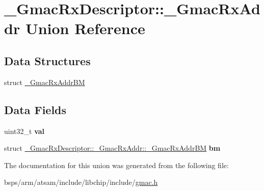 \hypertarget{union__GmacRxDescriptor_1_1__GmacRxAddr}{}\section{\+\_\+\+Gmac\+Rx\+Descriptor\+::\+\_\+\+Gmac\+Rx\+Addr Union Reference}
\label{union__GmacRxDescriptor_1_1__GmacRxAddr}
\subsection*{Data Structures}
\begin{DoxyCompactItemize}
\item 
struct \mbox{\hyperlink{struct__GmacRxDescriptor_1_1__GmacRxAddr_1_1__GmacRxAddrBM}{\+\_\+\+Gmac\+Rx\+Addr\+BM}}
\end{DoxyCompactItemize}
\subsection*{Data Fields}
\begin{DoxyCompactItemize}
\item 
uint32\+\_\+t {\bfseries val}
\item 
struct \mbox{\hyperlink{struct__GmacRxDescriptor_1_1__GmacRxAddr_1_1__GmacRxAddrBM}{\+\_\+\+Gmac\+Rx\+Descriptor\+::\+\_\+\+Gmac\+Rx\+Addr\+::\+\_\+\+Gmac\+Rx\+Addr\+BM}} {\bfseries bm}
\end{DoxyCompactItemize}


The documentation for this union was generated from the following file\+:\begin{DoxyCompactItemize}
\item 
bsps/arm/atsam/include/libchip/include/\mbox{\hyperlink{gmac_8h}{gmac.\+h}}\end{DoxyCompactItemize}

